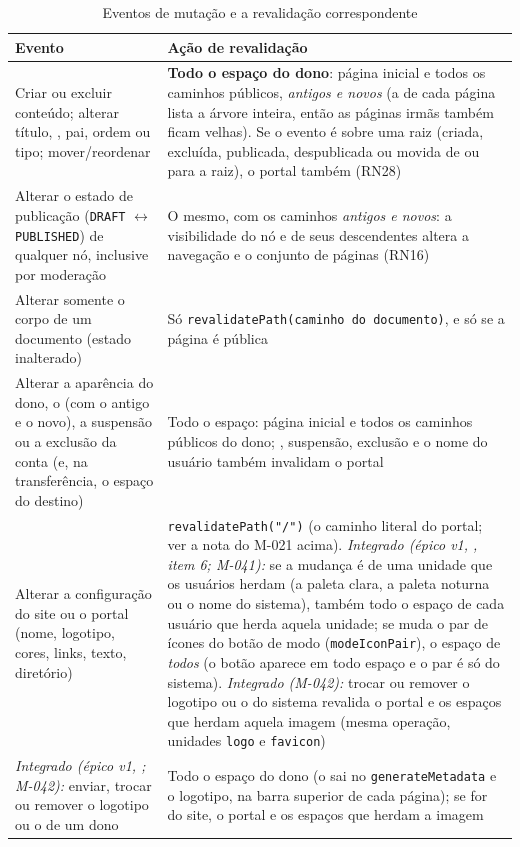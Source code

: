 \begin{table}[htb]
\caption{Eventos de mutação e a revalidação correspondente}\label{tab:revalidacao}
\small
\begin{tabularx}{\linewidth}{@{}L{5.2cm}Y@{}}
\toprule
\textbf{Evento} & \textbf{Ação de revalidação}\\
\midrule
Criar ou excluir conteúdo; alterar título, , pai, ordem ou tipo; mover/reordenar & \textbf{Todo o espaço do dono}: página inicial e todos os caminhos públicos, \emph{antigos e novos} (a  de cada página lista a árvore inteira, então as páginas irmãs também ficam velhas). Se o evento é sobre uma raiz (criada, excluída, publicada, despublicada ou movida de ou para a raiz), o portal também (RN28)\\
\addlinespace
Alterar o estado de publicação (\texttt{DRAFT} $\leftrightarrow$ \texttt{PUBLISHED}) de qualquer nó, inclusive por moderação & O mesmo, com os caminhos \emph{antigos e novos}: a visibilidade do nó e de seus descendentes altera a navegação e o conjunto de páginas (RN16)\\
\addlinespace
Alterar somente o corpo de um documento (estado inalterado) & Só \texttt{revalidatePath(caminho do documento)}, e só se a página é pública\\
\addlinespace
Alterar a aparência do dono, o  (com o antigo e o novo), a suspensão ou a exclusão da conta (e, na transferência, o espaço do destino) & Todo o espaço: página inicial e todos os caminhos públicos do dono; , suspensão, exclusão e o nome do usuário também invalidam o portal\\
\addlinespace
Alterar a configuração do site ou o portal (nome, logotipo, cores, links, texto, diretório) & \texttt{revalidatePath("/")} (o caminho literal do portal; ver a nota do M-021 acima). \emph{Integrado (épico v1, , item 6; M-041):} se a mudança é de uma unidade que os usuários herdam (a paleta clara, a paleta noturna ou o nome do sistema), também todo o espaço de cada usuário que herda aquela unidade; se muda o par de ícones do botão de modo (\texttt{modeIconPair}), o espaço de \emph{todos} (o botão aparece em todo espaço e o par é só do sistema). \emph{Integrado (M-042):} trocar ou remover o logotipo ou o  do sistema revalida o portal e os espaços que herdam aquela imagem (mesma operação, unidades \texttt{logo} e \texttt{favicon})\\
\addlinespace
\emph{Integrado (épico v1, ; M-042):} enviar, trocar ou remover o logotipo ou o  de um dono & Todo o espaço do dono (o  sai no \texttt{generateMetadata} e o logotipo, na barra superior de cada página); se for do site, o portal e os espaços que herdam a imagem\\

\end{tabularx}
\end{table}
